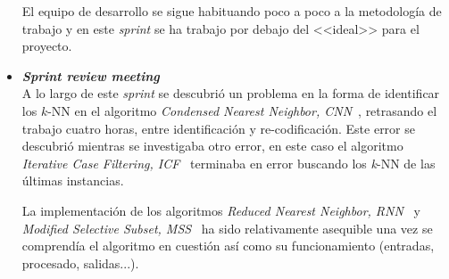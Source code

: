 \begin{itemize}
El equipo de desarrollo se sigue habituando poco a poco a la metodología de trabajo y en este \textit{sprint} se ha trabajo por debajo del <<ideal>> para el proyecto. 

\item \textbf{\textit{Sprint review meeting}}\\
A lo largo de este \textit{sprint} se descubrió un problema en la forma de identificar los $k$-NN en el algoritmo \textit{Condensed Nearest Neighbor, CNN}~\cite{hart1968condensed}, retrasando el trabajo cuatro horas, entre identificación y re-codificación. Este error se descubrió mientras se investigaba otro error, en este caso el algoritmo \textit{Iterative Case Filtering, ICF}~\cite{brighton2002advances} terminaba en error buscando los \textit{k}-NN de las últimas instancias.

La implementación de los algoritmos \textit{Reduced Nearest Neighbor, RNN}~\cite{gates1972reduced} y \textit{Modified Selective Subset, MSS}~\cite{barandela2005decision} ha sido relativamente asequible una vez se comprendía el algoritmo en cuestión así como su funcionamiento (entradas, procesado, salidas...).
\end{itemize}


